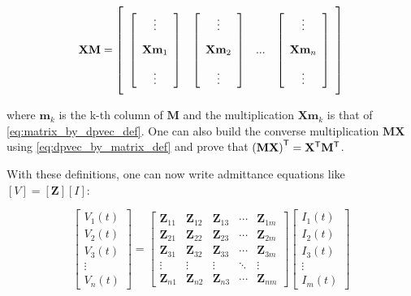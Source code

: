 \begin{equation} \mathbf{XM} = \left[\raisebox{15mm}{} \begin{array}{cccc} \left[\begin{array}{c} \vdots \\[3mm] \mathbf{X}\mathbf{m}_1 \\[3mm] \vdots \end{array}\right] & \left[\begin{array}{c} \vdots \\[3mm] \mathbf{X}\mathbf{m}_2 \\[3mm] \vdots \end{array}\right] & ... & \left[\begin{array}{c} \vdots \\[3mm] \mathbf{X}\mathbf{m}_n \\[3mm] \vdots \end{array}\right]\end{array}\right] \end{equation}

	\noindent where $\mathbf{m}_k$ is the k-th column of $\mathbf{M}$ and the multiplication $\mathbf{Xm}_k$ is that of \eqref{eq:matrix_by_dpvec_def}. One can also build the converse multiplication $\mathbf{MX}$ using \eqref{eq:dpvec_by_matrix_def} and prove that $\left(\mathbf{MX}\right)^{\mathsf{T}} = \mathbf{X}^{\mathsf{T}}\mathbf{M}^{\mathsf{T}}$.

	With these definitions, one can now write admittance equations like $\left[V\right] = \left[\mathbf{Z}\right]\left[I\right]$:

\begin{equation}
\left[\begin{array}{c} V_1(t) \\[3mm] V_2(t) \\[3mm] V_3(t) \\[3mm] \vdots \\[3mm] V_n(t) \end{array}\right] =
%
\left[\begin{array}{ccccc}
	\mathbf{Z}_{11} & \mathbf{Z}_{12} & \mathbf{Z}_{13} & \cdots & \mathbf{Z}_{1m} \\[3mm]
	\mathbf{Z}_{21} & \mathbf{Z}_{22} & \mathbf{Z}_{23} & \cdots & \mathbf{Z}_{2m} \\[3mm]
	\mathbf{Z}_{31} & \mathbf{Z}_{32} & \mathbf{Z}_{33} & \cdots & \mathbf{Z}_{3m} \\[3mm]
	\vdots          & \vdots          & \vdots          & \ddots & \vdots          \\[3mm]
	\mathbf{Z}_{n1} & \mathbf{Z}_{n2} & \mathbf{Z}_{n3} & \cdots & \mathbf{Z}_{nm}
\end{array}\right]
%
\left[\begin{array}{c} I_1(t) \\[3mm] I_2(t) \\[3mm] I_3(t) \\[3mm] \vdots \\[3mm] I_m(t) \end{array}\right] \label{eq:admittance_dpfs}
\end{equation}

